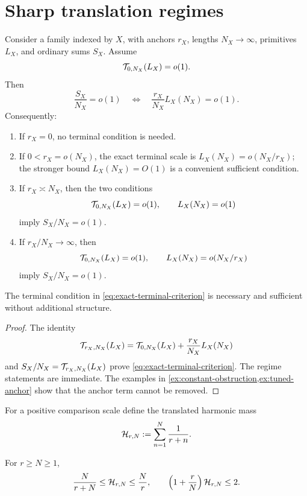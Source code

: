 \section{Sharp translation regimes}
\label{sec:regime-criteria}

\begin{theorem}
\label{thm:regime-criterion}
Consider a family indexed by \(X\), with anchors \(r_X\), lengths
\(N_X\to\infty\), primitives \(L_X\), and ordinary sums \(S_X\).
Assume
\[
 \mathcal T_{0,N_X}(L_X)=o(1).
\]
Then
\begin{equation}
 \frac{S_X}{N_X}=o(1)
 \quad\Longleftrightarrow\quad
 \frac{r_X}{N_X}L_X(N_X)=o(1).
\label{eq:exact-terminal-criterion}
\end{equation}
Consequently:
\begin{enumerate}[label=\textup{(\alph*)},leftmargin=2.5em]
\item If \(r_X=0\), no terminal condition is needed.
\item If \(0<r_X=o(N_X)\), the exact terminal scale is
  \(L_X(N_X)=o(N_X/r_X)\); the stronger bound
  \(L_X(N_X)=O(1)\) is a convenient sufficient condition.
\item If \(r_X\asymp N_X\), then the two conditions
  \[
  \mathcal T_{0,N_X}(L_X)=o(1),\qquad L_X(N_X)=o(1)
  \]
  imply \(S_X/N_X=o(1)\).
\item If \(r_X/N_X\to\infty\), then
  \[
  \mathcal T_{0,N_X}(L_X)=o(1),\qquad
  L_X(N_X)=o(N_X/r_X)
  \]
  imply \(S_X/N_X=o(1)\).
\end{enumerate}
The terminal condition in \eqref{eq:exact-terminal-criterion} is
necessary and sufficient without additional structure.
\end{theorem}

\begin{proof}
The identity
\[
 \mathcal T_{r_X,N_X}(L_X)
 =
 \mathcal T_{0,N_X}(L_X)
 +\frac{r_X}{N_X}L_X(N_X)
\]
and
\(S_X/N_X=\mathcal T_{r_X,N_X}(L_X)\) prove
\eqref{eq:exact-terminal-criterion}.  The regime statements are
immediate.  The examples in
\cref{ex:constant-obstruction,ex:tuned-anchor} show that the anchor
term cannot be removed.
\end{proof}

For a positive comparison scale define the translated harmonic mass
\begin{equation}
 \mathcal H_{r,N}:=\sum_{n=1}^N\frac1{r+n}.
\label{eq:harmonic-mass}
\end{equation}

\begin{lemma}
\label{lem:short-harmonic-mass}
For \(r\ge N\ge1\),
\begin{equation}
 \frac{N}{r+N}\le\mathcal H_{r,N}\le\frac Nr,
 \qquad
 \left(1+\frac rN\right)\mathcal H_{r,N}\le2.
\label{eq:short-harmonic-bounds}
\end{equation}
\end{lemma}

